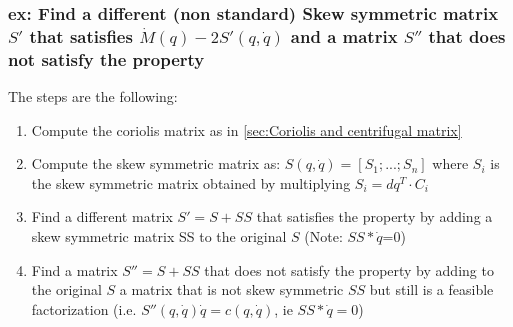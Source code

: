 \documentclass[a4paper,12pt]{article}
\begin{document}
\subsubsection{ex: Find a different (non standard) Skew symmetric matrix $S'$
that satisfies $\dot{M}(q)-2S'(q,\dot{q})$ and a matrix $S''$ that does not satisfy the property}
The steps are the following:
\begin{enumerate}
    \item Compute the coriolis matrix as in \ref{sec:Coriolis and centrifugal matrix}
    \item Compute the skew symmetric matrix as: $S(q,\dot{q}) = [S_1;...;S_n]$ where $S_i$ is 
    the skew symmetric matrix obtained by multiplying $S_i = dq^T \cdot C_i$
    \item Find a different matrix $S'= S + SS$ that satisfies the property by adding 
    a skew symmetric matrix SS to the original $S$ (Note: $SS*\dot{q}$=0)
    \item Find a matrix $S'' = S + SS$ that does not satisfy the property
    by adding to the original $S$ a matrix that is not skew symmetric $SS$
    but still is a feasible factorization (i.e. $S''(q,\dot{q}) \dot{q} 
    = c(q,\dot{q})$, ie $SS*\dot{q} = 0$)
\end{enumerate}
\end{document}

